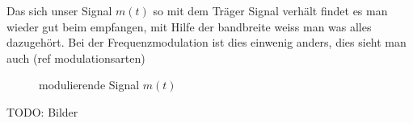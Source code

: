 Das sich unser Signal \(m(t)\)  so mit dem Träger Signal verhält findet es man wieder gut beim empfangen, mit Hilfe der bandbreite weiss man was alles dazugehört.
Bei der Frequenzmodulation ist dies einwenig anders, dies sieht man auch (ref modulationsarten)

\begin{figure}
	\centering
	
	\caption{modulierende Signal \(m(t)\)}
	\label{fig:bessel}
\end{figure}
%
TODO:
Bilder 


%
